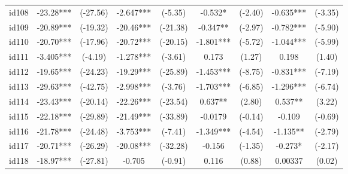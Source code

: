 \documentclass[entropy,article,submit,moreauthors,LaTeX and dvi2pdf]{Definitions/mdpi}
\begin{document}
\begin{center}
\begin{longtable}{ccccccccc}
id108                                         & -23.28***     & (-27.56)      & -2.647***       & (-5.35)          & -0.532*           & (-2.40)           & -0.635***         & (-3.35)           \\
id109                                         & -20.89***     & (-19.32)      & -20.46***       & (-21.38)         & -0.347**          & (-2.97)           & -0.782***         & (-5.90)           \\
id110                                         & -20.70***     & (-17.96)      & -20.72***       & (-20.15)         & -1.801***         & (-5.72)           & -1.044***         & (-5.99)           \\
id111                                         & -3.405***     & (-4.19)       & -1.278***       & (-3.61)          & 0.173             & (1.27)            & 0.198             & (1.40)            \\
id112                                         & -19.65***     & (-24.23)      & -19.29***       & (-25.89)         & -1.453***         & (-8.75)           & -0.831***         & (-7.19)           \\
id113                                         & -29.63***     & (-42.75)      & -2.998***       & (-3.76)          & -1.703***         & (-6.85)           & -1.296***         & (-6.74)           \\
id114                                         & -23.43***     & (-20.14)      & -22.26***       & (-23.54)         & 0.637**           & (2.80)            & 0.537**           & (3.22)            \\
id115                                         & -22.18***     & (-29.89)      & -21.49***       & (-33.89)         & -0.0179           & (-0.14)           & -0.109            & (-0.69)           \\
id116                                         & -21.78***     & (-24.48)      & -3.753***       & (-7.41)          & -1.349***         & (-4.54)           & -1.135**          & (-2.79)           \\
id117                                         & -20.71***     & (-26.29)      & -20.08***       & (-32.28)         & -0.156            & (-1.35)           & -0.273*           & (-2.17)           \\
id118                                         & -18.97***     & (-27.81)      & -0.705          & (-0.91)          & 0.116             & (0.88)            & 0.00337           & (0.02)            \\

\end{longtable}
\end{center}
\end{document}
